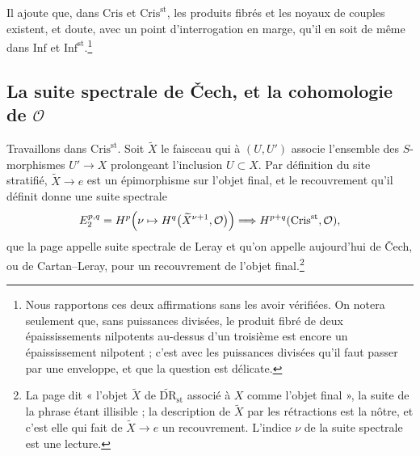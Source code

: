 \documentclass[11pt,a4paper]{article}
\begin{document}
Il ajoute que, dans $\mathrm{Cris}$ et $\mathrm{Cris}^{\mathrm{st}}$, les
produits fibrés et les noyaux de couples existent, et doute, avec un point
d'interrogation en marge, qu'il en soit de même dans $\mathrm{Inf}$ et
$\mathrm{Inf}^{\mathrm{st}}$.\footnote{Nous rapportons ces deux affirmations
sans les avoir vérifiées. On notera seulement que, sans puissances divisées,
le produit fibré de deux épaississements nilpotents au-dessus d'un troisième
est encore un épaississement nilpotent ; c'est avec les puissances divisées
qu'il faut passer par une enveloppe, et que la question est délicate.}

\subsection*{La suite spectrale de Čech, et la cohomologie de
$\mathcal{O}$}

Travaillons dans $\mathrm{Cris}^{\mathrm{st}}$. Soit $\widetilde{X}$ le
faisceau qui à $(U, U')$ associe l'ensemble des $S$-morphismes $U' \to X$
prolongeant l'inclusion $U \subset X$. Par définition du site stratifié,
$\widetilde{X} \to e$ est un épimorphisme sur l'objet final, et le
recouvrement qu'il définit donne une suite spectrale
\[
E_2^{p,q} = H^{p}\Bigl(\nu \mapsto H^{q}\bigl(\widetilde{X}^{\nu+1},
\mathcal{O}\bigr)\Bigr) \Longrightarrow H^{p+q}(\mathrm{Cris}^{\mathrm{st}},
\mathcal{O}),
\]
que la page appelle suite spectrale de Leray et qu'on appelle aujourd'hui
de Čech, ou de Cartan--Leray, pour un recouvrement de l'objet
final.\footnote{La page dit « l'objet $\widetilde{X}$ de
$\widetilde{\mathrm{DR}}_{\mathrm{st}}$ associé à $X$ comme l'objet final »,
la suite de la phrase étant illisible ; la description de $\widetilde{X}$
par les rétractions est la nôtre, et c'est elle qui fait de
$\widetilde{X} \to e$ un recouvrement. L'indice $\nu$ de la suite spectrale
est une lecture.}
\end{document}
